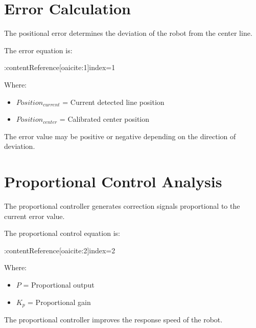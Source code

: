 \documentclass[12pt,a4paper,oneside]{report}
\begin{document}

\section{Error Calculation}

The positional error determines the deviation of the robot from the center line.

The error equation is:

:contentReference[oaicite:1]{index=1}

Where:

\begin{itemize}

\item \(Position_{current}\) = Current detected line position

\item \(Position_{center}\) = Calibrated center position

\end{itemize}

The error value may be positive or negative depending on the direction of deviation.


\section{Proportional Control Analysis}

The proportional controller generates correction signals proportional to the current error value.

The proportional control equation is:

:contentReference[oaicite:2]{index=2}

Where:

\begin{itemize}

\item \(P\) = Proportional output

\item \(K_p\) = Proportional gain

\end{itemize}

The proportional controller improves the response speed of the robot.
\end{document}
